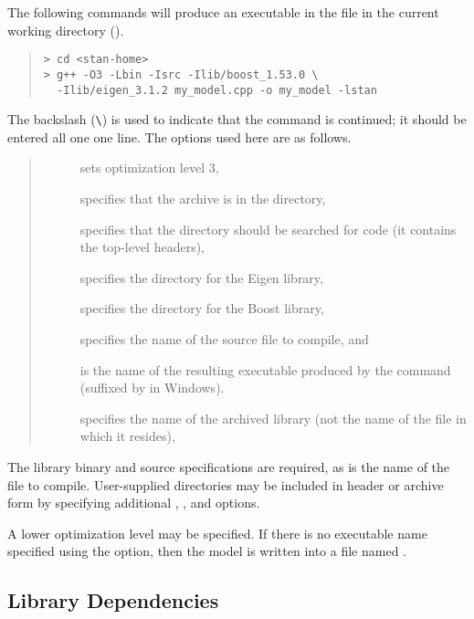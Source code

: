 The following commands will produce an executable in the file
 in the current working directory ().
%
\begin{quote}
\begin{Verbatim}[fontshape=sl,fontsize=\small]
> cd <stan-home>
> g++ -O3 -Lbin -Isrc -Ilib/boost_1.53.0 \
  -Ilib/eigen_3.1.2 my_model.cpp -o my_model -lstan
\end{Verbatim}
\end{quote} %
The backslash (\Verb|\|) is used to indicate that the command is
continued; it should be entered all one one line.
%
The options used here are as follows.
\begin{quote}
\begin{description}
\item[] sets optimization level 3,
\item[] specifies that the archive is in the 
  directory,
\item[] specifies that the directory  should be
  searched for code (it contains the top-level \Stan headers),
\item[] specifies the directory for
  the Eigen library,
\item[] specifies the directory for the 
  Boost library,
\item[] specifies the name of the source file to
  compile, and 
\item[] is the name of the resulting executable
  produced by the command (suffixed by \code{.exe} in Windows).
\item[] specifies the name of the archived library (not
  the name of the file in which it resides),
\end{description}
\end{quote}
%
The library binary and source specifications are required, as is the
name of the \Cpp file to compile.  User-supplied directories may be
included in header or archive form by specifying additional ,
\code{-l}, and \code{-I} options.
 
A lower optimization level may be specified.  If there is no
executable name specified using the  option, then the model
is written into a file named \code{a.out}.
 

\subsection{Library Dependencies}

